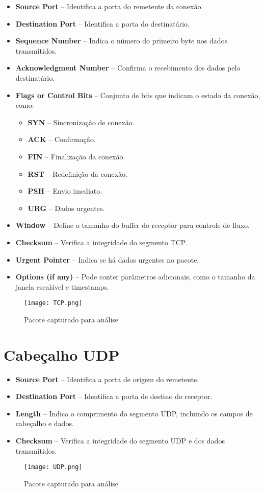 \documentclass{article} %
\begin{document}
\begin{itemize}
    \item \textbf{Source Port} – Identifica a porta do remetente da conexão.
    \item \textbf{Destination Port} – Identifica a porta do destinatário.
    \item \textbf{Sequence Number} – Indica o número do primeiro byte nos dados transmitidos.
    \item \textbf{Acknowledgment Number} – Confirma o recebimento dos dados pelo destinatário.
    \item \textbf{Flags or Control Bits} – Conjunto de bits que indicam o estado da conexão, como:
    \begin{itemize}
        \item \textbf{SYN} – Sincronização de conexão.
        \item \textbf{ACK} – Confirmação.
        \item \textbf{FIN} – Finalização da conexão.
        \item \textbf{RST} – Redefinição da conexão.
        \item \textbf{PSH} – Envio imediato.
        \item \textbf{URG} – Dados urgentes.
    \end{itemize}
    \item \textbf{Window} – Define o tamanho do buffer do receptor para controle de fluxo.
    \item \textbf{Checksum} – Verifica a integridade do segmento TCP.
    \item \textbf{Urgent Pointer} – Indica se há dados urgentes no pacote.
    \item \textbf{Options (if any)} – Pode conter parâmetros adicionais, como o tamanho da janela escalável e timestamps.
\end{itemize}

\begin{figure}[h] %
    \centering
    \texttt{[image: TCP.png]} 
    \caption{Pacote capturado para análise} %
    \label{fig:exemplo} 
\end{figure}

\section{Cabeçalho UDP}

\begin{itemize}
    \item \textbf{Source Port} – Identifica a porta de origem do remetente.
    \item \textbf{Destination Port} – Identifica a porta de destino do receptor.
    \item \textbf{Length} – Indica o comprimento do segmento UDP, incluindo os campos de cabeçalho e dados.
    \item \textbf{Checksum} – Verifica a integridade do segmento UDP e dos dados transmitidos.
\end{itemize}

\begin{figure}[h] %
    \centering
    \texttt{[image: UDP.png]} 
    \caption{Pacote capturado para análise} %
    \label{fig:exemplo} 
\end{figure}
\end{document}
